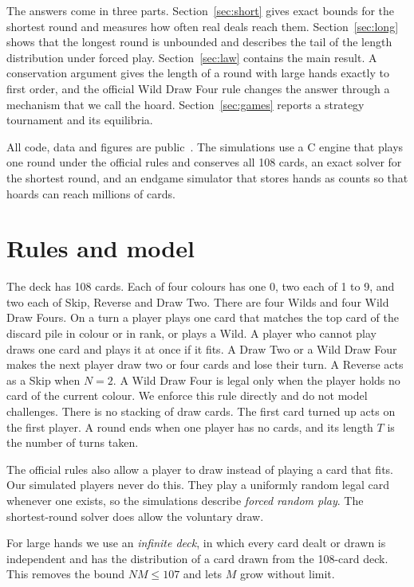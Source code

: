 \documentclass[11pt]{amsart}
\theoremstyle{remark}
\begin{document}
The answers come in three parts. Section~\ref{sec:short} gives exact bounds for the shortest round and measures how often real deals reach them. Section~\ref{sec:long} shows that the longest round is unbounded and describes the tail of the length distribution under forced play. Section~\ref{sec:law} contains the main result. A conservation argument gives the length of a round with large hands exactly to first order, and the official Wild Draw Four rule changes the answer through a mechanism that we call the hoard. Section~\ref{sec:games} reports a strategy tournament and its equilibria.

All code, data and figures are public~\cite{repo}. The simulations use a C engine that plays one round under the official rules and conserves all 108 cards, an exact solver for the shortest round, and an endgame simulator that stores hands as counts so that hoards can reach millions of cards.

\section{Rules and model}\label{sec:rules}

The deck has 108 cards. Each of four colours has one 0, two each of 1 to 9, and two each of Skip, Reverse and Draw Two. There are four Wilds and four Wild Draw Fours. On a turn a player plays one card that matches the top card of the discard pile in colour or in rank, or plays a Wild. A player who cannot play draws one card and plays it at once if it fits. A Draw Two or a Wild Draw Four makes the next player draw two or four cards and lose their turn. A Reverse acts as a Skip when $N=2$. A Wild Draw Four is legal only when the player holds no card of the current colour. We enforce this rule directly and do not model challenges. There is no stacking of draw cards. The first card turned up acts on the first player. A round ends when one player has no cards, and its length $T$ is the number of turns taken.

The official rules also allow a player to draw instead of playing a card that fits. Our simulated players never do this. They play a uniformly random legal card whenever one exists, so the simulations describe \emph{forced random play}. The shortest-round solver does allow the voluntary draw.

For large hands we use an \emph{infinite deck}, in which every card dealt or drawn is independent and has the distribution of a card drawn from the 108-card deck. This removes the bound $NM \le 107$ and lets $M$ grow without limit.
\end{document}
